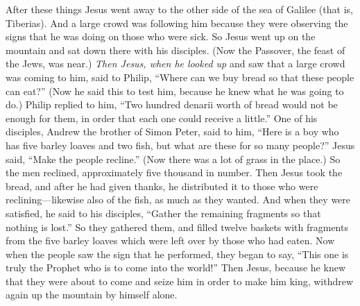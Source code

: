 \begin{biblechapter} %
 After these things Jesus went away to the other side of the sea of Galilee (that is, Tiberias).
\verse And a large crowd was following him because they were observing the signs that he was doing on those who were sick.
\verse So Jesus went up on the mountain and sat down there with his disciples.
\verse (Now the Passover, the feast of the Jews, was near.)
\verse \textit{Then Jesus, when he looked up}  and saw that a large crowd was coming to him, said to Philip, “Where can we buy bread so that these people can eat?”
\verse (Now he said this to test him, because he knew what he was going to do.)
\verse Philip replied to him, “Two hundred denarii worth of bread would not be enough for them, in order that each one could receive a little.”
\verse One of his disciples, Andrew the brother of Simon Peter, said to him,
\verse “Here is a boy who has five barley loaves and two fish, but what are these for so many people?”
\verse Jesus said, “Make the people recline.” (Now there was a lot of grass in the place.) So the men reclined, approximately five thousand in number.
\verse Then Jesus took the bread, and after he had given thanks, he distributed it to those who were reclining—likewise also of the fish, as much as they wanted.
\verse And when they were satisfied, he said to his disciples, “Gather the remaining fragments so that nothing is lost.”
\verse So they gathered them, and filled twelve baskets with fragments from the five barley loaves which were left over by those who had eaten.
\verse Now when the people saw the sign that he performed, they began to say, “This one is truly the Prophet who is to come into the world!”
\verse Then Jesus, because he knew that they were about to come and seize him in order to make him king, withdrew again up the mountain by himself alone.

\end{biblechapter}
